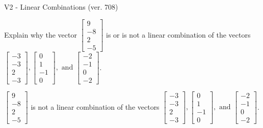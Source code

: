 \begin{exercise}
  \begin{exerciseTitle}V2 - Linear Combinations (ver. 708)\end{exerciseTitle}
  \begin{exerciseStatement}
    Explain why the vector \(\left[\begin{array}{c}
9 \\
-8 \\
2 \\
-5
\end{array}\right]\)  is or is not a linear 
	combination of the vectors \(\left[\begin{array}{c}
-3 \\
-3 \\
2 \\
-3
\end{array}\right] , \left[\begin{array}{c}
0 \\
1 \\
-1 \\
0
\end{array}\right] , \text{ and } \left[\begin{array}{c}
-2 \\
-1 \\
0 \\
-2
\end{array}\right]\).
	


  \end{exerciseStatement}
  \begin{exerciseAnswer}
   \(\left[\begin{array}{c}
9 \\
-8 \\
2 \\
-5
\end{array}\right]\) 
  	 is not  
	a linear combination of the vectors \(\left[\begin{array}{c}
-3 \\
-3 \\
2 \\
-3
\end{array}\right] , \left[\begin{array}{c}
0 \\
1 \\
-1 \\
0
\end{array}\right] , \text{ and } \left[\begin{array}{c}
-2 \\
-1 \\
0 \\
-2
\end{array}\right]\).

	
  


  \end{exerciseAnswer}
\end{exercise}
